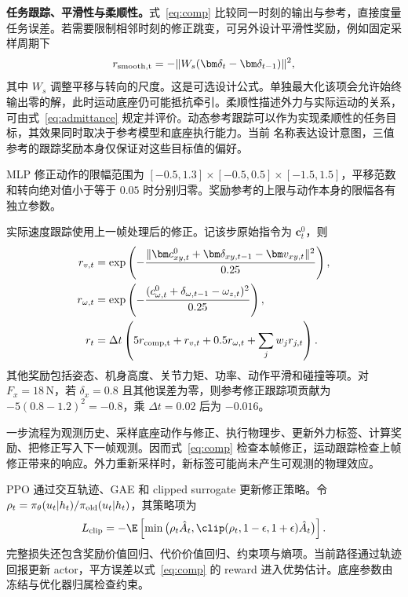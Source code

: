 \textbf{任务跟踪、平滑性与柔顺性。}式~\eqref{eq:comp} 比较同一时刻的输出与参考，直接度量任务误差。若需要限制相邻时刻的修正跳变，可另外设计平滑性奖励，例如固定采样周期下
\begin{equation}
 r_{\rm smooth,t}=-\|W_s(\bm\delta_t-\bm\delta_{t-1})\|^2,
\end{equation}
其中 $W_s$ 调整平移与转向的尺度。这是可选设计公式。单独最大化该项会允许始终输出零的解，此时运动底座仍可能抵抗牵引。柔顺性描述外力与实际运动的关系，可由式~\eqref{eq:admittance} 规定并评价。动态参考跟踪可以作为实现柔顺性的任务目标，其效果同时取决于参考模型和底座执行能力。当前  名称表达设计意图，三值参考的跟踪奖励本身仅保证对这些目标值的偏好。

MLP 修正动作的限幅范围为 $[-0.5,1.3]\times[-0.5,0.5]\times[-1.5,1.5]$，平移范数和转向绝对值小于等于 $0.05$ 时分别归零。奖励参考的上限与动作本身的限幅各有独立参数。

实际速度跟踪使用上一帧处理后的修正。记该步原始指令为 $\bm c^0_t$，则
\begin{align}
 r_{v,t}&=\exp\left(-\frac{\|\bm c^0_{xy,t}+\bm\delta_{xy,t-1}-\bm v_{xy,t}\|^2}{0.25}\right),\\
 r_{\omega,t}&=\exp\left(-\frac{(c^0_{\omega,t}+\delta_{\omega,t-1}-\omega_{z,t})^2}{0.25}\right),\\
 r_t&=\Delta t\left(5r_{\rm comp,t}+r_{v,t}+0.5r_{\omega,t}+\sum_j w_jr_{j,t}\right).
\end{align}
其他奖励包括姿态、机身高度、关节力矩、功率、动作平滑和碰撞等项。对 $F_x=18\,\mathrm N$，若 $\delta_x=0.8$ 且其他误差为零，则参考修正跟踪项贡献为 $-5(0.8-1.2)^2=-0.8$，乘 $\Delta t=0.02$ 后为 $-0.016$。

一步流程为观测历史、采样底座动作与修正、执行物理步、更新外力标签、计算奖励、把修正写入下一帧观测。因而式~\eqref{eq:comp} 检查本帧修正，运动跟踪检查上帧修正带来的响应。外力重新采样时，新标签可能尚未产生可观测的物理效应。

PPO 通过交互轨迹、GAE 和 clipped surrogate 更新修正策略。令
$\rho_t=\pi_\theta(u_t|h_t)/\pi_{\rm old}(u_t|h_t)$，其策略项为
\begin{equation}
 L_{\rm clip}=-\E\left[\min\big(\rho_t\hat A_t,
 \clip(\rho_t,1-\epsilon,1+\epsilon)\hat A_t\big)\right].
\end{equation}
完整损失还包含奖励价值回归、代价价值回归、约束项与熵项。当前路径通过轨迹回报更新 actor，平方误差以式~\eqref{eq:comp} 的 reward 进入优势估计。底座参数由冻结与优化器归属检查约束。\cite{schulman2017}
